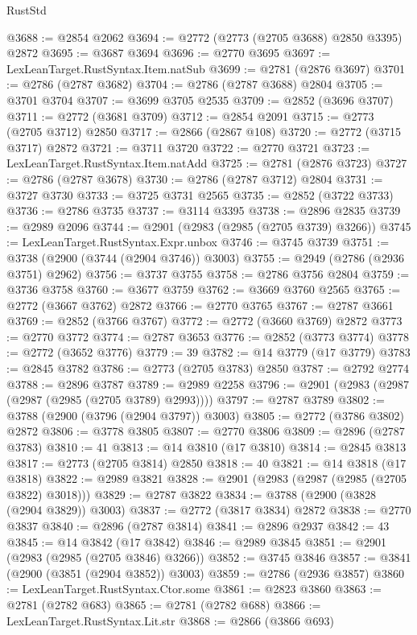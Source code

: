 \begin{lexlean}{RustStd}
\begin{coremodule}
@3688 := @2854 @2062
@3694 := @2772 (@2773 (@2705 @3688) @2850 @3395) @2872
@3695 := @3687 @3694
@3696 := @2770 @3695
@3697 := LexLeanTarget.RustSyntax.Item.natSub
@3699 := @2781 (@2876 @3697)
@3701 := @2786 (@2787 @3682)
@3704 := @2786 (@2787 @3688) @2804
@3705 := @3701 @3704
@3707 := @3699 @3705 @2535
@3709 := @2852 (@3696 @3707)
@3711 := @2772 (@3681 @3709)
@3712 := @2854 @2091
@3715 := @2773 (@2705 @3712) @2850
@3717 := @2866 (@2867 @108)
@3720 := @2772 (@3715 @3717) @2872
@3721 := @3711 @3720
@3722 := @2770 @3721
@3723 := LexLeanTarget.RustSyntax.Item.natAdd
@3725 := @2781 (@2876 @3723)
@3727 := @2786 (@2787 @3678)
@3730 := @2786 (@2787 @3712) @2804
@3731 := @3727 @3730
@3733 := @3725 @3731 @2565
@3735 := @2852 (@3722 @3733)
@3736 := @2786 @3735
@3737 := @3114 @3395
@3738 := @2896 @2835
@3739 := @2989 @2096
@3744 := @2901 (@2983 (@2985 (@2705 @3739) @3266))
@3745 := LexLeanTarget.RustSyntax.Expr.unbox
@3746 := @3745 @3739
@3751 := @3738 (@2900 (@3744 (@2904 @3746)) @3003)
@3755 := @2949 (@2786 (@2936 @3751) @2962)
@3756 := @3737 @3755
@3758 := @2786 @3756 @2804
@3759 := @3736 @3758
@3760 := @3677 @3759
@3762 := @3669 @3760 @2565
@3765 := @2772 (@3667 @3762) @2872
@3766 := @2770 @3765
@3767 := @2787 @3661
@3769 := @2852 (@3766 @3767)
@3772 := @2772 (@3660 @3769) @2872
@3773 := @2770 @3772
@3774 := @2787 @3653
@3776 := @2852 (@3773 @3774)
@3778 := @2772 (@3652 @3776)
@3779 := 39
@3782 := @14 @3779 (@17 @3779)
@3783 := @2845 @3782
@3786 := @2773 (@2705 @3783) @2850
@3787 := @2792 @2774
@3788 := @2896 @3787
@3789 := @2989 @2258
@3796 := @2901 (@2983 (@2987 (@2987 (@2985 (@2705 @3789) @2993))))
@3797 := @2787 @3789
@3802 := @3788 (@2900 (@3796 (@2904 @3797)) @3003)
@3805 := @2772 (@3786 @3802) @2872
@3806 := @3778 @3805
@3807 := @2770 @3806
@3809 := @2896 (@2787 @3783)
@3810 := 41
@3813 := @14 @3810 (@17 @3810)
@3814 := @2845 @3813
@3817 := @2773 (@2705 @3814) @2850
@3818 := 40
@3821 := @14 @3818 (@17 @3818)
@3822 := @2989 @3821
@3828 := @2901 (@2983 (@2987 (@2985 (@2705 @3822) @3018)))
@3829 := @2787 @3822
@3834 := @3788 (@2900 (@3828 (@2904 @3829)) @3003)
@3837 := @2772 (@3817 @3834) @2872
@3838 := @2770 @3837
@3840 := @2896 (@2787 @3814)
@3841 := @2896 @2937
@3842 := 43
@3845 := @14 @3842 (@17 @3842)
@3846 := @2989 @3845
@3851 := @2901 (@2983 (@2985 (@2705 @3846) @3266))
@3852 := @3745 @3846
@3857 := @3841 (@2900 (@3851 (@2904 @3852)) @3003)
@3859 := @2786 (@2936 @3857)
@3860 := LexLeanTarget.RustSyntax.Ctor.some
@3861 := @2823 @3860
@3863 := @2781 (@2782 @683)
@3865 := @2781 (@2782 @688)
@3866 := LexLeanTarget.RustSyntax.Lit.str
@3868 := @2866 (@3866 @693)

\end{coremodule}
\end{lexlean}
